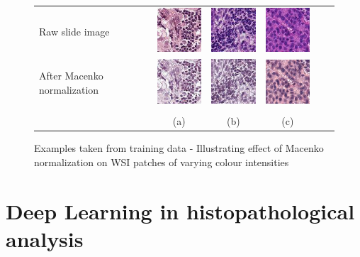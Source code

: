 \documentclass{l4proj}
\begin{document}
\begin{figure}[H]
\centering
\begin{tabular}{lccccc}
Raw slide image&
\includegraphics[width=80px]{images/37.jpeg}&
\includegraphics[width=80px]{images/68.jpeg}&
\includegraphics[width=80px]{images/195.jpeg}\\
After Macenko normalization&
 \includegraphics[width=80px]{images/37_macenko.jpeg}&
 \includegraphics[width=80px]{images/68_macenko.jpeg}&
 \includegraphics[width=80px]{images/195_macenko.jpeg}\\
 \\&
 (a)&(b)&(c)\\
\end{tabular}
\caption{Examples taken from training data - Illustrating effect of Macenko normalization on WSI patches of varying colour intensities }
\label{fig:macenko-example}
\end{figure}

\section{Deep Learning in histopathological analysis}
\end{document}

